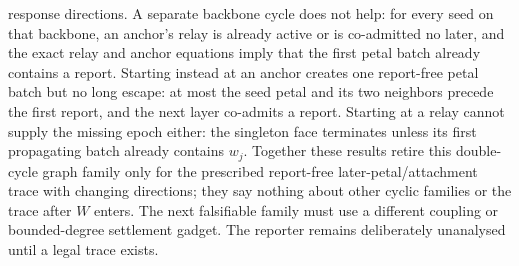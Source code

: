response directions.  A separate backbone cycle does not help: for every seed
on that backbone, an anchor's relay is already active or is co-admitted no
later, and the exact relay and anchor equations imply that the first petal
batch already contains a report.  Starting instead at an anchor creates one
report-free petal batch but no long escape: at most the seed petal and its two
neighbors precede the first report, and the next layer co-admits a report.
Starting at a relay cannot supply the missing epoch either: the singleton
face terminates unless its first propagating batch already contains $w_j$.
Together these results retire this double-cycle graph family only for the
prescribed report-free later-petal/attachment trace with changing directions;
they say nothing about other cyclic families or the trace after $W$ enters.
The next falsifiable family must use a different coupling or bounded-degree
settlement gadget.
The reporter remains deliberately unanalysed until a legal trace exists.
